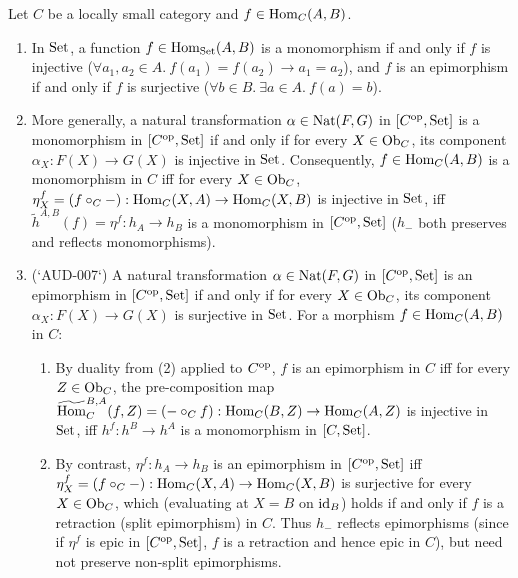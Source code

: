 \documentclass[10pt,a4paper]{article}
\begin{document}
\begin{theorem}\label{thm:mono_epi_yoneda}
Let $C$ be a locally small category and $f \in {\textrm{Hom}}_C(A, B)$.
\begin{enumerate}
\item In ${\textrm{Set}}$, a function $f \in {\textrm{Hom}}_{\textrm{Set}}(A, B)$ is a monomorphism if and only if $f$ is injective ($\forall a_1, a_2 \in A.\ f(a_1) = f(a_2) \to a_1 = a_2$), and $f$ is an epimorphism if and only if $f$ is surjective ($\forall b \in B.\ \exists a \in A.\ f(a) = b$).
\item More generally, a natural transformation $\alpha \in {\textrm{Nat}}(F, G)$ in $[C^{\textrm{op}}, {\textrm{Set}}]$ is a monomorphism in $[C^{\textrm{op}}, {\textrm{Set}}]$ if and only if for every $X \in {\textrm{Ob}}_C$, its component $\alpha_X : F(X) \to G(X)$ is injective in ${\textrm{Set}}$. Consequently, $f \in {\textrm{Hom}}_C(A, B)$ is a monomorphism in $C$ iff for every $X \in {\textrm{Ob}}_C$, $\eta^f_X = (f \circ_C -) : {\textrm{Hom}}_C(X, A) \to {\textrm{Hom}}_C(X, B)$ is injective in ${\textrm{Set}}$, iff $\widetilde{h}^{A,B}(f) = \eta^f : h_A \to h_B$ is a monomorphism in $[C^{\textrm{op}}, {\textrm{Set}}]$ ($h_-$ both preserves and reflects monomorphisms).
\item (`AUD-007`) A natural transformation $\alpha \in {\textrm{Nat}}(F, G)$ in $[C^{\textrm{op}}, {\textrm{Set}}]$ is an epimorphism in $[C^{\textrm{op}}, {\textrm{Set}}]$ if and only if for every $X \in {\textrm{Ob}}_C$, its component $\alpha_X : F(X) \to G(X)$ is surjective in ${\textrm{Set}}$. For a morphism $f \in {\textrm{Hom}}_C(A, B)$ in $C$:
  \begin{enumerate}
  \item[(a)] By duality from (2) applied to $C^{\textrm{op}}$, $f$ is an epimorphism in $C$ iff for every $Z \in {\textrm{Ob}}_C$, the pre-composition map ${\widetilde{{\textrm{Hom}}}\textrm{}}_C^{B,A}(f, Z) = (- \circ_C f) : {\textrm{Hom}}_C(B, Z) \to {\textrm{Hom}}_C(A, Z)$ is injective in ${\textrm{Set}}$, iff $h^f : h^B \to h^A$ is a monomorphism in $[C, {\textrm{Set}}]$.
  \item[(b)] By contrast, $\eta^f : h_A \to h_B$ is an epimorphism in $[C^{\textrm{op}}, {\textrm{Set}}]$ iff $\eta^f_X = (f \circ_C -) : {\textrm{Hom}}_C(X, A) \to {\textrm{Hom}}_C(X, B)$ is surjective for every $X \in {\textrm{Ob}}_C$, which (evaluating at $X = B$ on ${\textrm{id}}_B$) holds if and only if $f$ is a retraction (split epimorphism) in $C$. Thus $h_-$ reflects epimorphisms (since if $\eta^f$ is epic in $[C^{\textrm{op}}, {\textrm{Set}}]$, $f$ is a retraction and hence epic in $C$), but need not preserve non-split epimorphisms.
  \end{enumerate}
\end{enumerate}
\end{theorem}
\end{document}
